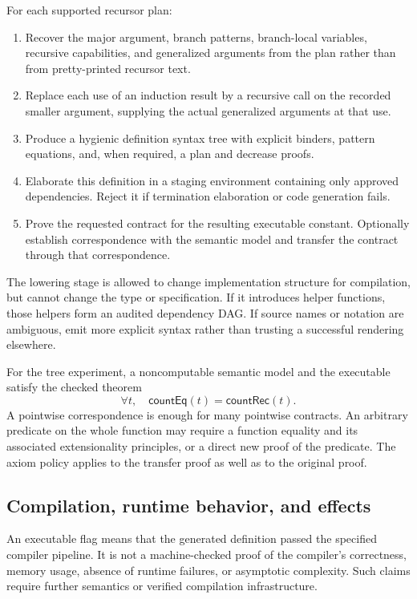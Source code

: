 \documentclass[11pt,a4paper]{article}
\newcommand{\code}[1]{\texttt{\detokenize{#1}}}
\theoremstyle{remark}
\begin{document}
For each supported recursor plan:
\begin{enumerate}
\item Recover the major argument, branch patterns, branch-local variables, recursive capabilities, and generalized arguments from the plan rather than from pretty-printed recursor text.
\item Replace each use of an induction result by a recursive call on the recorded smaller argument, supplying the actual generalized arguments at that use.
\item Produce a hygienic definition syntax tree with explicit binders, pattern equations, and, when required, a \code{termination_by} plan and decrease proofs.
\item Elaborate this definition in a staging environment containing only approved dependencies. Reject it if termination elaboration or code generation fails.
\item Prove the requested contract for the resulting executable constant. Optionally establish correspondence with the semantic model and transfer the contract through that correspondence.
\end{enumerate}

The lowering stage is allowed to change implementation structure for compilation, but cannot change the type or specification. If it introduces helper functions, those helpers form an audited dependency DAG. If source names or notation are ambiguous, emit more explicit syntax rather than trusting a successful rendering elsewhere.

For the tree experiment, a noncomputable semantic model \code{countRec} and the executable \code{countEq} satisfy the checked theorem
\[
 \forall t,\quad\mathsf{countEq}(t)=\mathsf{countRec}(t).
\]
A pointwise correspondence is enough for many pointwise contracts. An arbitrary predicate on the whole function may require a function equality and its associated extensionality principles, or a direct new proof of the predicate. The axiom policy applies to the transfer proof as well as to the original proof.

\subsection{Compilation, runtime behavior, and effects}

An executable flag means that the generated definition passed the specified compiler pipeline. It is not a machine-checked proof of the compiler's correctness, memory usage, absence of runtime failures, or asymptotic complexity. Such claims require further semantics or verified compilation infrastructure.
\end{document}
